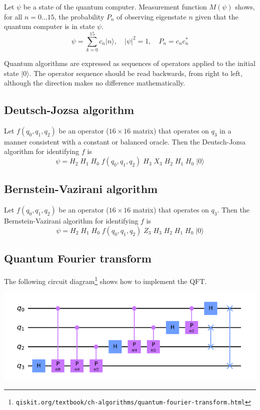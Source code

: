 \documentclass[12pt]{article}
\begin{document}
\bigskip
\noindent
Let $\psi$ be a state of the quantum computer.
Measurement function $M(\psi)$ shows, for all $n=0\ldots15$, the probability $P_n$ of observing eigenstate $n$
given that the quantum computer is in state $\psi$.
\begin{equation*}
\psi=\sum_{k=0}^{15}c_n|n\rangle,\quad|\psi|^2=1,\quad P_n=c_nc_n^*
\end{equation*}

\noindent
Quantum algorithms are expressed as sequences of operators applied
to the initial state $|0\rangle$.
The operator sequence should be read backwards, from right to left,
although the direction makes no difference mathematically.

\subsection*{Deutsch-Jozsa algorithm}
Let $f(q_0,q_1,q_2)$ be an operator ($16\times16$ matrix) that operates on $q_3$
in a manner consistent with a constant or balanced oracle.
Then the Deutsch-Jozsa algorithm for identifying $f$ is
\begin{equation*}
\psi = H_2 \; H_1 \; H_0 \; f(q_0,q_1,q_2) \; H_3 \; X_3 \; H_2 \; H_1 \; H_0 \; |0\rangle
\end{equation*}

\subsection*{Bernstein-Vazirani algorithm}
Let $f(q_0,q_1,q_2)$ be an operator ($16\times16$ matrix) that operates on $q_3$.
Then the Bernstein-Vazirani algorithm for identifying $f$ is
\begin{equation*}
\psi = H_2 \; H_1 \; H_0 \; f(q_0,q_1,q_2) \; Z_3 \; H_3 \; H_2 \; H_1 \; H_0 \; |0\rangle
\end{equation*}

\subsection*{Quantum Fourier transform}
The following circuit diagram\footnote{\tt qiskit.org/textbook/ch-algorithms/quantum-fourier-transform.html}
shows how to implement the QFT.

\begin{center}
\includegraphics[scale=0.5]{qft.png}
\end{center}
\end{document}
